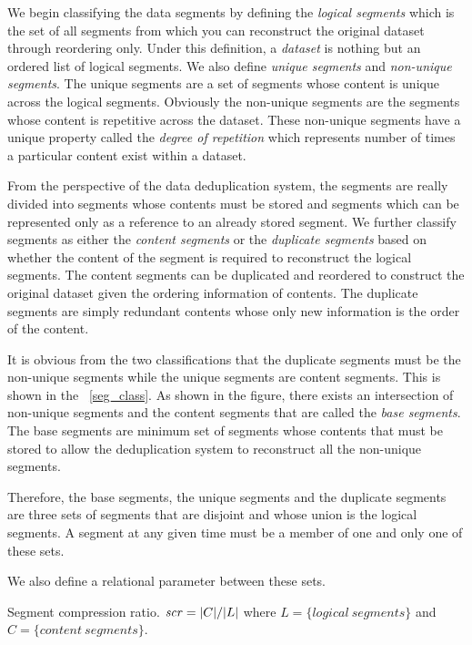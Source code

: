 We begin classifying the data segments by defining the \emph{logical segments} which is the set of all segments from which you can reconstruct the original dataset through reordering only. Under this definition, a \emph{dataset} is nothing but an ordered list of logical segments. We also define \emph{unique segments} and \emph{non-unique segments}. The unique segments are a set of segments whose content is unique across the logical segments. Obviously the non-unique segments are the segments whose content is repetitive across the dataset. These non-unique segments have a unique property called the \emph{degree of repetition} which represents number of  times a particular content exist within a dataset.

From the perspective of the data deduplication system, the segments are really divided into segments whose contents must be stored and segments which can be represented only as a reference to an already stored segment. We further classify segments as either the \emph{content segments} or the \emph{duplicate segments} based on whether the content of the segment is required to reconstruct the logical segments. The content segments can be duplicated and reordered to construct the original dataset given the ordering information of contents. The duplicate segments are simply redundant contents whose only new information is the order of the content.

It is obvious from the two classifications that the duplicate segments must be the non-unique segments while the unique segments are content segments. This is shown in the \figurename~\ref{seg_class}. As shown in the figure, there exists an intersection of non-unique segments and the content segments that are called the \emph{base segments}. The base segments are minimum set of segments whose contents that must be stored to allow the deduplication system to reconstruct all the non-unique segments.

Therefore, the base segments, the unique segments and the duplicate segments are three sets of segments that are disjoint and whose union is the logical segments. A segment at any given time must be a member of one and only one of these sets.

We also define a relational parameter between these sets.
\begin{definition}\label{scr}
Segment compression ratio. $\mathit{scr} = \lvert C\rvert/\lvert L\rvert$ where $L=\{\mathit{logical\ segments}\}$ and $C=\{\mathit{content\ segments}\}$. 
\end{definition}

